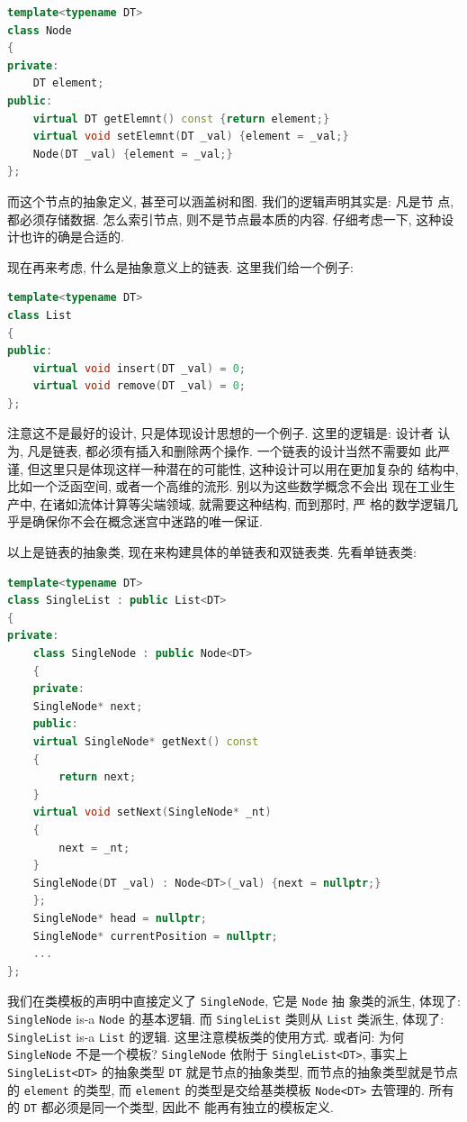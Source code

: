 \documentclass[a4paper]{ctexart}
\theoremstyle{definition}
\theoremstyle{definition}
\begin{document}
\begin{lstlisting}[language=C++]
template<typename DT>
class Node
{
private:
    DT element;
public:
    virtual DT getElemnt() const {return element;}
    virtual void setElemnt(DT _val) {element = _val;}
    Node(DT _val) {element = _val;}
};
\end{lstlisting}

而这个节点的抽象定义, 甚至可以涵盖树和图. 我们的逻辑声明其实是: 凡是节
点, 都必须存储数据. 怎么索引节点, 则不是节点最本质的内容. 仔细考虑一下,
这种设计也许的确是合适的.

现在再来考虑, 什么是抽象意义上的链表. 这里我们给一个例子:

\begin{lstlisting}[language=C++]
template<typename DT>
class List
{
public:
    virtual void insert(DT _val) = 0;
    virtual void remove(DT _val) = 0;
};
\end{lstlisting}

注意这不是最好的设计, 只是体现设计思想的一个例子. 这里的逻辑是: 设计者
认为, 凡是链表, 都必须有插入和删除两个操作. 一个链表的设计当然不需要如
此严谨, 但这里只是体现这样一种潜在的可能性, 这种设计可以用在更加复杂的
结构中, 比如一个泛函空间, 或者一个高维的流形. 别以为这些数学概念不会出
现在工业生产中, 在诸如流体计算等尖端领域, 就需要这种结构, 而到那时, 严
格的数学逻辑几乎是确保你不会在概念迷宫中迷路的唯一保证.

以上是链表的抽象类, 现在来构建具体的单链表和双链表类. 先看单链表类:

\begin{lstlisting}[language=C++]
template<typename DT>
class SingleList : public List<DT>
{
private:
    class SingleNode : public Node<DT>
    {
    private:
	SingleNode* next;
    public:
	virtual SingleNode* getNext() const
	{
	    return next;
	}
	virtual void setNext(SingleNode* _nt)
	{
	    next = _nt;
	}
	SingleNode(DT _val) : Node<DT>(_val) {next = nullptr;}
    };
    SingleNode* head = nullptr;
    SingleNode* currentPosition = nullptr;
    ...
};
\end{lstlisting}

我们在类模板的声明中直接定义了 \verb|SingleNode|, 它是 \verb|Node| 抽
象类的派生, 体现了: \verb|SingleNode| is-a \verb|Node| 的基本逻辑. 而
\verb|SingleList| 类则从 \verb|List| 类派生, 体现了: \verb|SingleList|
is-a \verb|List| 的逻辑. 这里注意模板类的使用方式. 或者问: 为何
\verb|SingleNode| 不是一个模板? \verb|SingleNode| 依附于
\verb|SingleList<DT>|, 事实上 \verb|SingleList<DT>| 的抽象类型
\verb|DT| 就是节点的抽象类型, 而节点的抽象类型就是节点的
\verb|element| 的类型, 而 \verb|element| 的类型是交给基类模板
\verb|Node<DT>| 去管理的. 所有的 \verb|DT| 都必须是同一个类型, 因此不
能再有独立的模板定义. 
\end{document}
